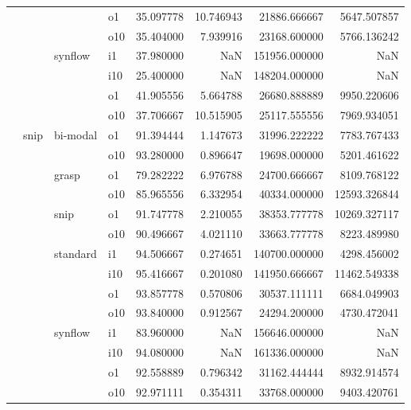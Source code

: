 \begin{longtable}{llllrrrr}
      &     &         & o1 &  35.097778 &  10.746943 &     21886.666667 &   5647.507857 \\
      &     &         & o10 &  35.404000 &   7.939916 &     23168.600000 &   5766.136242 \\
      &     & synflow & i1 &  37.980000 &        NaN &    151956.000000 &           NaN \\
      &     &         & i10 &  25.400000 &        NaN &    148204.000000 &           NaN \\
      &     &         & o1 &  41.905556 &   5.664788 &     26680.888889 &   9950.220606 \\
      &     &         & o10 &  37.706667 &  10.515905 &     25117.555556 &   7969.934051 \\
      & snip & bi-modal & o1 &  91.394444 &   1.147673 &     31996.222222 &   7783.767433 \\
      &     &         & o10 &  93.280000 &   0.896647 &     19698.000000 &   5201.461622 \\
      &     & grasp & o1 &  79.282222 &   6.976788 &     24700.666667 &   8109.768122 \\
      &     &         & o10 &  85.965556 &   6.332954 &     40334.000000 &  12593.326844 \\
      &     & snip & o1 &  91.747778 &   2.210055 &     38353.777778 &  10269.327117 \\
      &     &         & o10 &  90.496667 &   4.021110 &     33663.777778 &   8223.489980 \\
      &     & standard & i1 &  94.506667 &   0.274651 &    140700.000000 &   4298.456002 \\
      &     &         & i10 &  95.416667 &   0.201080 &    141950.666667 &  11462.549338 \\
      &     &         & o1 &  93.857778 &   0.570806 &     30537.111111 &   6684.049903 \\
      &     &         & o10 &  93.840000 &   0.912567 &     24294.200000 &   4730.472041 \\
      &     & synflow & i1 &  83.960000 &        NaN &    156646.000000 &           NaN \\
      &     &         & i10 &  94.080000 &        NaN &    161336.000000 &           NaN \\
      &     &         & o1 &  92.558889 &   0.796342 &     31162.444444 &   8932.914574 \\
      &     &         & o10 &  92.971111 &   0.354311 &     33768.000000 &   9403.420761 \\

\end{longtable}

